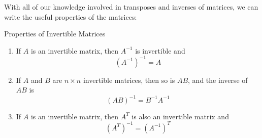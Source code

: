 \documentclass{article}
\begin{document}
With all of our knowledge involved in transposes and inverses of matrices, we can write the useful properties of the matrices:

\begin{theorem}{Properties of Invertible Matrices}
	\begin{enumerate}[label=\alph*)]
		\item
		      If $A$ is an invertible matrix, then $A^{-1}$ is invertible and
		      $$
			      (A^{-1})^{-1} = A
		      $$
		\item
		      If $A$ and $B$ are $n \times n$ invertible matrices, then so is $AB$, and the inverse of $AB$ is
		      $$
			      (AB)^{-1} = B^{-1}A^{-1}
		      $$
		\item
		      If $A$ is an invertible matrix, then $A^T$ is also an invertible matrix and
		      $$
			      (A^T)^{-1} = (A^{-1})^T
		      $$
	\end{enumerate}
\end{theorem}
\end{document}
